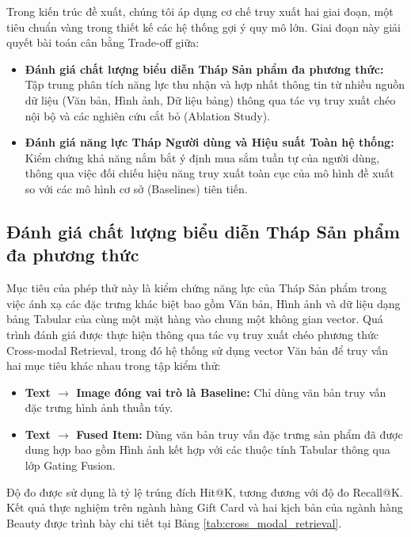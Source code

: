 Trong kiến trúc đề xuất, chúng tôi áp dụng cơ chế truy xuất hai giai đoạn, một tiêu chuẩn vàng trong thiết kế các hệ thống gợi ý quy mô lớn. Giai đoạn này giải quyết bài toán cân bằng Trade-off giữa:
\begin{itemize}
    \item \textbf{Đánh giá chất lượng biểu diễn Tháp Sản phẩm đa phương thức:} Tập trung phân tích năng lực thu nhận và hợp nhất thông tin từ nhiều nguồn dữ liệu (Văn bản, Hình ảnh, Dữ liệu bảng) thông qua tác vụ truy xuất chéo nội bộ và các nghiên cứu cắt bỏ (Ablation Study).
    
    \item \textbf{Đánh giá năng lực Tháp Người dùng và Hiệu suất Toàn hệ thống:} Kiểm chứng khả năng nắm bắt ý định mua sắm tuần tự của người dùng, thông qua việc đối chiếu hiệu năng truy xuất toàn cục của mô hình đề xuất so với các mô hình cơ sở (Baselines) tiên tiến.
\end{itemize}

\subsection{Đánh giá chất lượng biểu diễn Tháp Sản phẩm đa phương thức}

Mục tiêu của phép thử này là kiểm chứng năng lực của Tháp Sản phẩm trong việc ánh xạ các đặc trưng khác biệt bao gồm Văn bản, Hình ảnh và dữ liệu dạng bảng Tabular của cùng một mặt hàng vào chung một không gian vector. Quá trình đánh giá được thực hiện thông qua tác vụ truy xuất chéo phương thức Cross-modal Retrieval, trong đó hệ thống sử dụng vector Văn bản để truy vấn hai mục tiêu khác nhau trong tập kiểm thử:

\begin{itemize}
    \item \textbf{Text $\rightarrow$ Image đóng vai trò là Baseline:} Chỉ dùng văn bản truy vấn đặc trưng hình ảnh thuần túy.
    \item \textbf{Text $\rightarrow$ Fused Item:} Dùng văn bản truy vấn đặc trưng sản phẩm đã được dung hợp bao gồm Hình ảnh kết hợp với các thuộc tính Tabular thông qua lớp Gating Fusion.
\end{itemize}

Độ đo được sử dụng là tỷ lệ trúng đích Hit@K, tương đương với độ đo Recall@K. Kết quả thực nghiệm trên ngành hàng Gift Card và hai kịch bản của ngành hàng Beauty được trình bày chi tiết tại Bảng \ref{tab:cross_modal_retrieval}.

